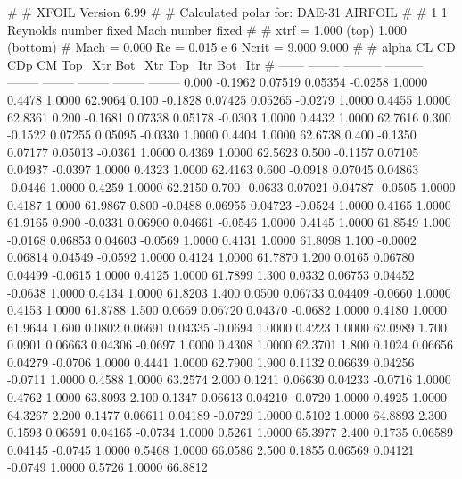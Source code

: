 #  
#       XFOIL         Version 6.99
#  
# Calculated polar for: DAE-31 AIRFOIL                                  
#  
# 1 1 Reynolds number fixed          Mach number fixed         
#  
# xtrf =   1.000 (top)        1.000 (bottom)  
# Mach =   0.000     Re =     0.015 e 6     Ncrit =   9.000  9.000
#  
#   alpha    CL        CD       CDp       CM     Top_Xtr  Bot_Xtr  Top_Itr  Bot_Itr
#  ------ -------- --------- --------- -------- -------- -------- -------- --------
   0.000  -0.1962   0.07519   0.05354  -0.0258   1.0000   0.4478   1.0000  62.9064
   0.100  -0.1828   0.07425   0.05265  -0.0279   1.0000   0.4455   1.0000  62.8361
   0.200  -0.1681   0.07338   0.05178  -0.0303   1.0000   0.4432   1.0000  62.7616
   0.300  -0.1522   0.07255   0.05095  -0.0330   1.0000   0.4404   1.0000  62.6738
   0.400  -0.1350   0.07177   0.05013  -0.0361   1.0000   0.4369   1.0000  62.5623
   0.500  -0.1157   0.07105   0.04937  -0.0397   1.0000   0.4323   1.0000  62.4163
   0.600  -0.0918   0.07045   0.04863  -0.0446   1.0000   0.4259   1.0000  62.2150
   0.700  -0.0633   0.07021   0.04787  -0.0505   1.0000   0.4187   1.0000  61.9867
   0.800  -0.0488   0.06955   0.04723  -0.0524   1.0000   0.4165   1.0000  61.9165
   0.900  -0.0331   0.06900   0.04661  -0.0546   1.0000   0.4145   1.0000  61.8549
   1.000  -0.0168   0.06853   0.04603  -0.0569   1.0000   0.4131   1.0000  61.8098
   1.100  -0.0002   0.06814   0.04549  -0.0592   1.0000   0.4124   1.0000  61.7870
   1.200   0.0165   0.06780   0.04499  -0.0615   1.0000   0.4125   1.0000  61.7899
   1.300   0.0332   0.06753   0.04452  -0.0638   1.0000   0.4134   1.0000  61.8203
   1.400   0.0500   0.06733   0.04409  -0.0660   1.0000   0.4153   1.0000  61.8788
   1.500   0.0669   0.06720   0.04370  -0.0682   1.0000   0.4180   1.0000  61.9644
   1.600   0.0802   0.06691   0.04335  -0.0694   1.0000   0.4223   1.0000  62.0989
   1.700   0.0901   0.06663   0.04306  -0.0697   1.0000   0.4308   1.0000  62.3701
   1.800   0.1024   0.06656   0.04279  -0.0706   1.0000   0.4441   1.0000  62.7900
   1.900   0.1132   0.06639   0.04256  -0.0711   1.0000   0.4588   1.0000  63.2574
   2.000   0.1241   0.06630   0.04233  -0.0716   1.0000   0.4762   1.0000  63.8093
   2.100   0.1347   0.06613   0.04210  -0.0720   1.0000   0.4925   1.0000  64.3267
   2.200   0.1477   0.06611   0.04189  -0.0729   1.0000   0.5102   1.0000  64.8893
   2.300   0.1593   0.06591   0.04165  -0.0734   1.0000   0.5261   1.0000  65.3977
   2.400   0.1735   0.06589   0.04145  -0.0745   1.0000   0.5468   1.0000  66.0586
   2.500   0.1855   0.06569   0.04121  -0.0749   1.0000   0.5726   1.0000  66.8812
